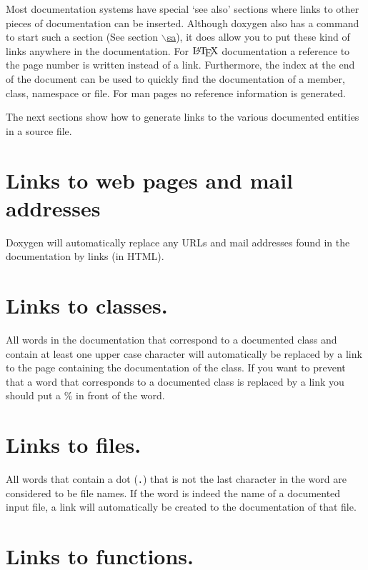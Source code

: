 Most documentation systems have special `see also' sections where links to other pieces of documentation can be inserted. Although doxygen also has a command to start such a section (See section \hyperlink{commands_cmdsa}{$\backslash$sa}), it does allow you to put these kind of links anywhere in the documentation. For $\mbox{\LaTeX}$ documentation a reference to the page number is written instead of a link. Furthermore, the index at the end of the document can be used to quickly find the documentation of a member, class, namespace or file. For man pages no reference information is generated.

The next sections show how to generate links to the various documented entities in a source file.\hypertarget{autolink_linkurl}{}\section{Links to web pages and mail addresses}\label{autolink_linkurl}
Doxygen will automatically replace any URLs and mail addresses found in the documentation by links (in HTML).\hypertarget{autolink_linkclass}{}\section{Links to classes.}\label{autolink_linkclass}
All words in the documentation that correspond to a documented class and contain at least one upper case character will automatically be replaced by a link to the page containing the documentation of the class. If you want to prevent that a word that corresponds to a documented class is replaced by a link you should put a \% in front of the word.\hypertarget{autolink_linkfile}{}\section{Links to files.}\label{autolink_linkfile}
All words that contain a dot ({\tt .}) that is not the last character in the word are considered to be file names. If the word is indeed the name of a documented input file, a link will automatically be created to the documentation of that file.\hypertarget{autolink_linkfunc}{}\section{Links to functions.}\label{autolink_linkfunc}
